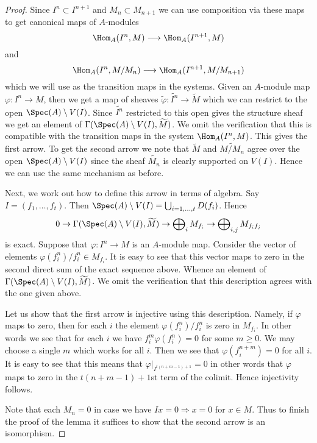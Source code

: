 \begin{proof}
Since $I^n \subset I^{n + 1}$ and $M_n \subset M_{n + 1}$ we can
use composition via these maps to get canonical maps of $A$-modules
$$
\Hom_A(I^n, M)
\longrightarrow
\Hom_A(I^{n + 1}, M)
$$
and
$$
\Hom_A(I^n, M/M_n)
\longrightarrow
\Hom_A(I^{n + 1}, M/M_{n + 1})
$$
which we will use as the transition maps in the systems. Given an
$A$-module map $\varphi : I^n \to M$, then we get a map of
sheaves $\widetilde{\varphi} : \widetilde{I^n} \to \widetilde{M}$
which we can restrict to the open $\Spec(A) \setminus V(I)$.
Since $\widetilde{I^n}$ restricted to this open gives the structure
sheaf we get an element of
$\Gamma(\Spec(A) \setminus V(I), \widetilde{M})$.
We omit the verification that this is compatible with the transition maps
in the system $\Hom_A(I^n, M)$. This gives the first arrow.
To get the second arrow we note that
$\widetilde{M}$ and $\widetilde{M/M_n}$ agree over the open
$\Spec(A) \setminus V(I)$ since the sheaf $\widetilde{M_n}$
is clearly supported on $V(I)$. Hence we can use the same mechanism
as before.

\medskip\noindent
Next, we work out how to define this arrow in terms of algebra.
Say $I = (f_1, \ldots, f_t)$. Then
$\Spec(A) \setminus V(I) = \bigcup_{i = 1, \ldots, t} D(f_i)$.
Hence
$$
0 \to
\Gamma(\Spec(A) \setminus V(I), \widetilde{M}) \to
\bigoplus\nolimits_i M_{f_i} \to
\bigoplus\nolimits_{i, j} M_{f_if_j}
$$
is exact. Suppose that $\varphi : I^n \to M$ is an $A$-module map.
Consider the vector of elements $\varphi(f_i^n)/f_i^n \in M_{f_i}$.
It is easy to see that this vector maps to zero in the
second direct sum of the exact sequence above. Whence an element
of $\Gamma(\Spec(A) \setminus V(I), \widetilde{M})$.
We omit the verification that this description agrees with the one
given above.

\medskip\noindent
Let us show that the first arrow is injective using this description.
Namely, if $\varphi$ maps to zero, then for each $i$ the element
$\varphi(f_i^n)/f_i^n$ is zero in $M_{f_i}$. In other words we
see that for each $i$ we have $f_i^m\varphi(f_i^n) = 0$ for some $m \geq 0$.
We may choose a single $m$ which works for all $i$. Then we see that
$\varphi(f_i^{n + m}) = 0$ for all $i$. It is easy to see that
this means that $\varphi|_{I^{t(n + m - 1) + 1}} = 0$ in other
words that $\varphi$ maps to zero in the $t(n + m - 1) + 1$st
term of the colimit. Hence injectivity follows.

\medskip\noindent
Note that each $M_n = 0$ in case we have
$Ix = 0 \Rightarrow x = 0$ for $x \in M$. Thus
to finish the proof of the lemma it suffices to show that
the second arrow is an isomorphism.


\end{proof}
